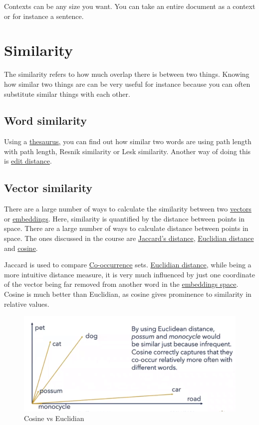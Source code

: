 \documentclass[
  11pt,
  british,
]{article}
\begin{document}
Contexts can be any size you want. You can take an entire document as a
context or for instance a sentence.

\hypertarget{similarity}{%
\section{Similarity}\label{similarity}}

The similarity refers to how much overlap there is between two things.
Knowing how similar two things are can be very useful for instance
because you can often substitute similar things with each other.

\hypertarget{word-similarity-1}{%
\subsection{Word similarity}\label{word-similarity-1}}

Using a \href{../Data/Thesaurus.md}{thesaurus,} you can find out how
similar two words are using path length with path length, Resnik
similarity or Lesk similarity. Another way of doing this is
\href{../Languages/Edit\%20distance.md}{edit distance}.

\hypertarget{vector-similarity}{%
\subsection{Vector similarity}\label{vector-similarity}}

There are a large number of ways to calculate the similarity between two
\href{Vector\%20semantics.md}{vectors} or
\href{Embeddings.md}{embeddings}. Here, similarity is quantified by the
distance between points in space. There are a large number of ways to
calculate distance between points in space. The ones discussed in the
course are \href{Jaccard's\%20distance.md}{Jaccard's distance},
\href{Euclidian\%20distance.md}{Euclidian distance} and
\href{Cosine.md}{cosine}.

Jaccard is used to compare \href{Co-occurrence.md}{Co-occurrence} sets.
\href{Euclidian\%20distance.md}{Euclidian distance}, while being a more
intuitive distance measure, it is very much influenced by just one
coordinate of the vector being far removed from another word in the
\href{Embeddings.md}{embeddings space}. Cosine is much better than
Euclidian, as cosine gives prominence to similarity in relative values.

\begin{figure}
\centering
\includegraphics{Pasted_image_20220602232429.png}
\caption{Cosine vs Euclidian}
\end{figure}
\end{document}
